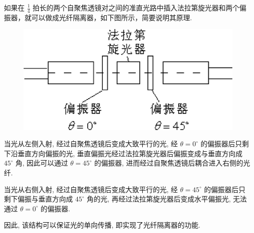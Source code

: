 \documentclass{assignment}
\begin{document}
\begin{prob}
    如果在 $\frac{1}{4}$ 拍长的两个自聚焦透镜对之间的准直光路中插入法拉第旋光器和两个偏振器，就可以做成光纤隔离器，如下图所示，简要说明其原理.
    \begin{figure}[h]
        \centering
        \includegraphics[width=.5\columnwidth]{2-4.png}
    \end{figure}
\end{prob}
\begin{ans}
    当光从左侧入射, 经过自聚焦透镜后变成大致平行的光, 经 $\theta=0^{\circ}$ 的偏振器后只剩下沿垂直方向偏振的光, 垂直偏振光经过法拉第旋光器后偏振变成与垂直方向成 $45^{\circ}$ 角, 因此可以通过 $\theta=45^{\circ}$ 的偏振器, 进而经过自聚焦透镜后耦合进入右侧的光纤.

    当光从右侧入射, 经过自聚焦透镜后变成大致平行的光, 经 $\theta=45^{\circ}$ 的偏振器后只剩下偏振与垂直方向成 $45^{\circ}$ 角的光, 再经过法拉第旋光器后变成水平偏振光, 无法通过 $\theta=0^{\circ}$ 的偏振器.

    因此, 该结构可以保证光的单向传播, 即实现了光纤隔离器的功能.
\end{ans}
\end{document}
